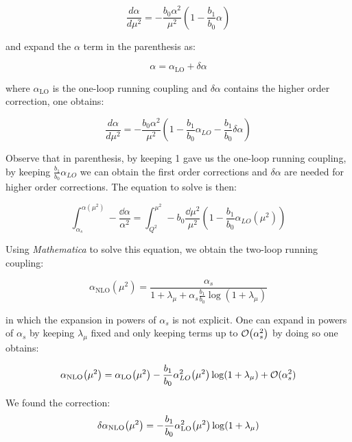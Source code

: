 \documentclass[../main.tex]{subfiles}
\begin{document}
\begin{equation}
    \frac{d\alpha}{d\mu^2} = - \frac{b_0 \alpha^2}{\mu^2} ( 1 - \frac{b_1}{b_0} \alpha )
\end{equation}

and expand the $\alpha$ term in the parenthesis as:

\begin{equation}
    \alpha = \alpha_{\text{LO}} + \delta \alpha
\end{equation}

where $\alpha_{\text{LO}}$ is the one-loop running coupling and $\delta\alpha$ contains the higher order correction, one obtains:

\begin{equation}
    \frac{d\alpha}{d\mu^2} = - \frac{b_0 \alpha^2}{\mu^2} ( 1 - \frac{b_1}{b_0} \alpha_{LO} - \frac{b_1}{b_0} \delta\alpha)
\end{equation}

Observe that in parenthesis, by keeping 1 gave us the one-loop running coupling, by keeping $\frac{b_1}{b_0} \alpha_{LO}$ we can obtain the first order corrections
and $\delta\alpha$ are needed for higher order corrections. The equation to solve is then:

\begin{equation}
    \int_{\alpha_s}^{\alpha(\mu^2)} -\frac{\dd\alpha}{\alpha^2} = 
    \int _{Q^2}^{\mu^2} - b_0 \frac{ \dd\mu^2}{\mu^2} ( 1 - \frac{b_1}{b_0} \alpha_{LO}(\mu^2) )
\end{equation}

Using \emph{Mathematica} to solve this equation, we obtain the two-loop running coupling:

\begin{equation}
    \alpha_{\text{NLO}}(\mu^2) = \frac{\alpha_s}{1+\lambda_\mu + \alpha_s \frac{b_1}{b_0} \log(1+\lambda_\mu)}
\end{equation}

in which the expansion in powers of $\alpha_s$ is not explicit. One can expand 
in powers of $\alpha_s$ by keeping $\lambda_\mu$ fixed and only keeping terms up to 
$\order{\alpha_s^2}$ by doing so one obtains:

\begin{equation}\label{eq:NLO}
    \alpha_{\text{NLO}}\qty(\mu^2) = \alpha_{\text{LO}}\qty(\mu^2) -\frac{b_1}{b_0} \alpha_{LO}^2\qty(\mu^2) \log(1+\lambda_\mu) + \mathcal{O}(\alpha_s^2)
\end{equation}

We found the correction: 
\begin{equation}\label{eq:DNLO}
\delta\alpha_{\text{NLO}}\qty(\mu^2) = -\frac{b_1}{b_0} \alpha_{\text{LO}}^2\qty(\mu^2) \log(1+\lambda_\mu)
\end{equation}
\end{document}

